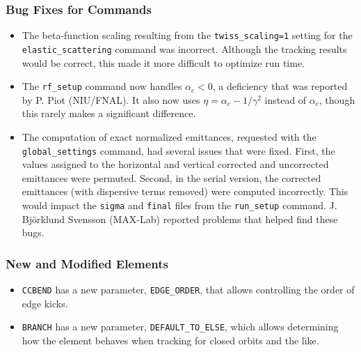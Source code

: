 \documentclass[11pt]{article}
\begin{document}
\subsubsection{Bug Fixes for Commands}
\begin{itemize}
\item The beta-function scaling resulting from the \verb|twiss_scaling=1| setting
  for the \verb|elastic_scattering| command was incorrect. Although the tracking results would be correct,
  this made it more difficult to optimize run time.
\item The \verb|rf_setup| command now handles $\alpha_c<0$, a deficiency that was reported by P. Piot (NIU/FNAL).
  It also now uses $\eta = \alpha_c - 1/\gamma^2$ instead of $\alpha_c$, though this rarely makes a significant
  difference.
\item The computation of exact normalized emittances, requested with the \verb|global_settings| command,
  had several issues that were fixed. First, the values assigned to the horizontal and vertical corrected and
  uncorrected emittances were permuted. Second, in the serial version, the corrected emittances (with dispersive
  terms removed) were computed incorrectly. This would impact the \verb|sigma| and \verb|final| files from
  the \verb|run_setup| command. J. Bj{\"o}rklund Svensson (MAX-Lab) reported problems that helped find these
  bugs.
\end{itemize}

\subsubsection{New and Modified Elements}
\begin{itemize}
\item \verb|CCBEND| has a new parameter, \verb|EDGE_ORDER|, that allows controlling the order of edge kicks.
\item \verb|BRANCH| has a new parameter, \verb|DEFAULT_TO_ELSE|, which allows determining how the element
  behaves when tracking for closed orbits and the like. 
\end{itemize}
\end{document}

